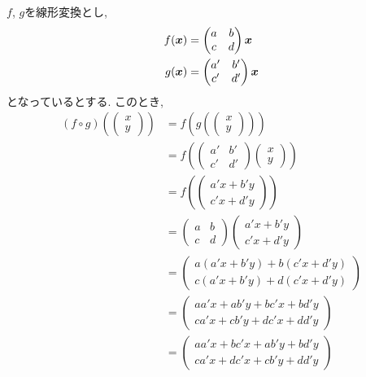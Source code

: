 \begin{remark}
  \label{rem:comp:prod}
  $f$, $g$を線形変換とし,
  \begin{align*}
    f(\boldsymbol{x})&=\begin{pmatrix}a&b\\c&d\end{pmatrix}\boldsymbol{x} \\
    g(\boldsymbol{x})&=\begin{pmatrix}a'&b'\\c'&d'\end{pmatrix}\boldsymbol{x} 
  \end{align*}
  となっているとする.
  このとき,
  \begin{align*}
    (f\circ g)(\begin{pmatrix}x\\y\end{pmatrix})
      &=f(g(\begin{pmatrix}x\\y\end{pmatrix}))\\
    &=f(\begin{pmatrix}a'&b'\\c'&d'\end{pmatrix}\begin{pmatrix}x\\y\end{pmatrix})\\
    &=f(\begin{pmatrix}a'x+b'y\\c'x+d'y\end{pmatrix})\\
    &=\begin{pmatrix}a&b\\c&d\end{pmatrix}\begin{pmatrix}a'x+b'y\\c'x+d'y\end{pmatrix}\\
    &=\begin{pmatrix}a(a'x+b'y)+b(c'x+d'y)\\c(a'x+b'y)+d(c'x+d'y)\end{pmatrix}\\
    &=\begin{pmatrix}aa'x+ab'y+bc'x+bd'y\\ca'x+cb'y+dc'x+dd'y\end{pmatrix}\\
    &=\begin{pmatrix}aa'x+bc'x+ab'y+bd'y\\ca'x+dc'x+cb'y+dd'y\end{pmatrix}\\

\end{align*}
\end{remark}
